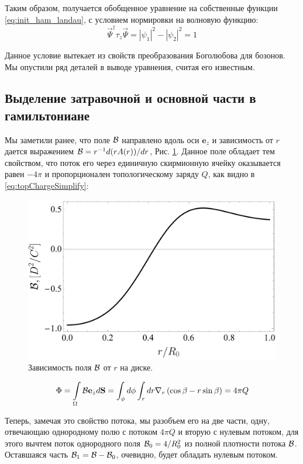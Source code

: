 \documentclass[a4paper,article,14pt]{extarticle}
\begin{document}
Таким образом, получается обобщенное уравнение на собственные функции \eqref{eq:init_ham_landau}, с условием нормировки на волновую функцию:
$$
\vec{\Psi}^\dagger \tau_z \vec{\Psi} =|\psi_1|^2-|\psi_2|^2=1
$$

Данное условие вытекает из свойств преобразования Боголюбова для бозонов. Мы опустили ряд деталей в выводе уравнения, считая его известным.\cite{garst}


\subsection{ Выделение затравочной и основной части в гамильтониане }

Мы заметили ранее, что поле $\cal B$ направлено вдоль оси $\mathbf{e}_z$ и зависимость от $r$ дается выражением  ${\cal B} = r^{-1} d(r A(r))/dr$, Рис. \ref{fig:B_top}. Данное поле обладает тем свойством, что поток его через единичную скирмионную ячейку оказывается равен $ -4\pi $ и пропорционален топологическому заряду  $Q$, как видно в \eqref{eq:topChargeSimplify}:


\begin{figure}[t]
\centering	
\includegraphics[width=0.9\columnwidth]{images/b_dependence.pdf}
\caption{Зависимость поля $\cal B$ от $r$ на диске. }
\label{fig:B_top}
\end{figure}


\begin{equation}
\Phi = \int \limits_\Omega {\cal B} \mathbf{e}_z d\mathbf{S} = \int_\phi d \phi \int_r d r \nabla_r \left(\cos\beta   -  r  \sin \beta \right)  = 4 \pi Q
\end{equation}

Теперь, замечая это свойство потока, мы разобъем его на две части, одну, отвечающаю однородному полю с потоком $4 \pi Q$ и вторую с нулевым потоком, для этого вычтем поток однородного поля ${\cal B}_{0} = 4/R_{0}^{2}$  из полной плотности потока  $\cal B$. Оставшаяся часть ${\cal B}_{1} = {\cal B} - {\cal B}_{0}$, очевидно, будет обладать нулевым потоком.
 
\end{document}
